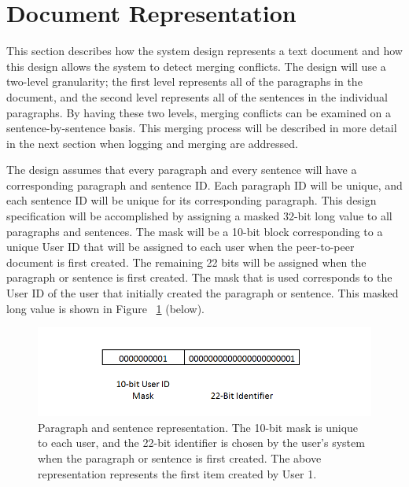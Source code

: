 \section{Document Representation}
This section describes how the system design represents a text document and how this design allows the system to detect merging conflicts. The design will use a two-level granularity; the first level represents all of the paragraphs in the document, and the second level represents all of the sentences in the individual paragraphs. By having these two levels, merging conflicts can be examined on a sentence-by-sentence basis. This merging process will be described in more detail in the next section when logging and merging are addressed.

The design assumes that every paragraph and every sentence will have a corresponding paragraph and sentence ID. Each paragraph ID will be unique, and each sentence ID will be unique for its corresponding paragraph. This design specification will be accomplished by assigning a masked 32-bit long value to all paragraphs and sentences. The mask will be a 10-bit block corresponding to a unique User ID that will be assigned to each user when the peer-to-peer document is first created. The remaining 22 bits will be assigned when the paragraph or sentence is first created. The mask that is used corresponds to the User ID of the user that initially created the paragraph or sentence.  This masked long value is shown in Figure ~\ref{fig:id_figure} (below).

\begin{figure}[b]
\includegraphics[scale=0.55]{Figure1.png}
\caption{Paragraph and sentence representation. The 10-bit mask is unique to each user, and the 22-bit identifier is chosen by the user's system when the paragraph or sentence is first created. The above representation represents the first item created by User 1.}
\label{fig:id_figure}
\end{figure}

